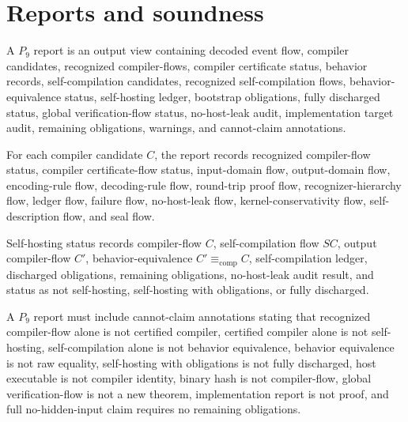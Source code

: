 \section{Reports and soundness}
\label{sec:self-hosting-reports-soundness}

\begin{definition}[$P_9$ report]
\label{def:self-hosting-p9-report}
A $P_9$ report is an output view containing decoded event flow, compiler candidates, recognized compiler-flows, compiler certificate status, behavior records, self-compilation candidates, recognized self-compilation flows, behavior-equivalence status, self-hosting ledger, bootstrap obligations, fully discharged status, global verification-flow status, no-host-leak audit, implementation target audit, remaining obligations, warnings, and cannot-claim annotations.
\end{definition}

\begin{definition}
\label{def:self-hosting-field-status}
For each compiler candidate $C$, the report records recognized compiler-flow status, compiler certificate-flow status, input-domain flow, output-domain flow, encoding-rule flow, decoding-rule flow, round-trip proof flow, recognizer-hierarchy flow, ledger flow, failure flow, no-host-leak flow, kernel-conservativity flow, self-description flow, and seal flow.

Self-hosting status records compiler-flow $C$, self-compilation flow $SC$, output compiler-flow $C'$, behavior-equivalence $C'\equiv_{\mathrm{comp}}C$, self-compilation ledger, discharged obligations, remaining obligations, no-host-leak audit result, and status as not self-hosting, self-hosting with obligations, or fully discharged.
\end{definition}

\begin{definition}
\label{def:self-hosting-p9-cannot-claims}
A $P_9$ report must include cannot-claim annotations stating that recognized compiler-flow alone is not certified compiler, certified compiler alone is not self-hosting, self-compilation alone is not behavior equivalence, behavior equivalence is not raw equality, self-hosting with obligations is not fully discharged, host executable is not compiler identity, binary hash is not compiler-flow, global verification-flow is not a new theorem, implementation report is not proof, and full no-hidden-input claim requires no remaining obligations.
\end{definition}

